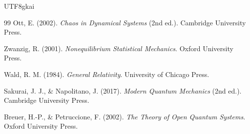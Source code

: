 \documentclass[12pt]{article}
\begin{document}
\begin{CJK*}{UTF8}{gkai}
\begin{thebibliography}{99}
Ott, E. (2002).
\newblock \emph{Chaos in Dynamical Systems} (2nd ed.).
\newblock Cambridge University Press.

Zwanzig, R. (2001).
\newblock \emph{Nonequilibrium Statistical Mechanics}.
\newblock Oxford University Press.

Wald, R. M. (1984).
\newblock \emph{General Relativity}.
\newblock University of Chicago Press.

Sakurai, J. J., \& Napolitano, J. (2017).
\newblock \emph{Modern Quantum Mechanics} (2nd ed.).
\newblock Cambridge University Press.

Breuer, H.-P., \& Petruccione, F. (2002).
\newblock \emph{The Theory of Open Quantum Systems}.
\newblock Oxford University Press.

\end{thebibliography}

\end{CJK*}
\end{document}

